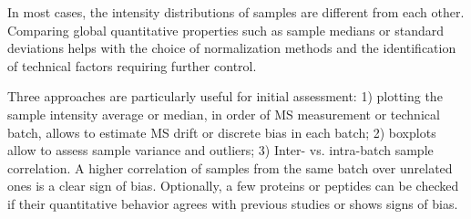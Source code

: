 \documentclass[num-refs]{wiley-article}
\begin{document}
In most cases, the intensity distributions of samples are different from each other. Comparing global quantitative properties such as sample medians or standard deviations helps with the choice of normalization methods and the identification of technical factors requiring further control. 

Three approaches are particularly useful for initial assessment: 1) plotting the sample intensity average or median, in order of MS measurement or technical batch, allows to estimate MS drift or discrete bias in each batch; 2) boxplots allow to assess sample variance and outliers; 3) Inter- vs. intra-batch sample correlation. A higher correlation of samples from the same batch over unrelated ones is a clear sign of bias. Optionally, a few proteins or peptides can be checked if their quantitative behavior agrees with previous studies or shows signs of bias.
\end{document}
